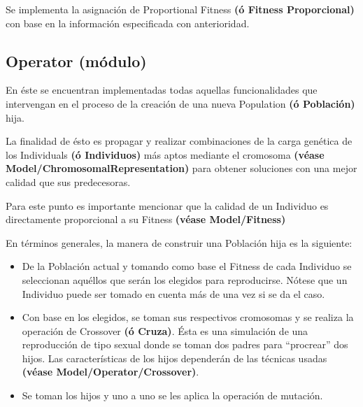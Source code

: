 \documentclass[letterpaper,10pt,english]{sphinxmanual}
\begin{document}
\begin{fulllineitems}
\label{Model/Fitness/ProportionalFitness:Model.Fitness.ProportionalFitness.assign_fitness}
Se implementa la asignación de Proportional Fitness \textbf{(ó Fitness Proporcional)}
con base en la información especificada con anterioridad.

\end{fulllineitems}



\subsection{Operator (módulo)}
\label{Model/Operator/Operator:operator-modulo}\label{Model/Operator/Operator::doc}
\begin{DUlineblock}{0em}
\item[] En éste se encuentran implementadas todas aquellas funcionalidades que intervengan
en el proceso de la creación de una nueva Population \textbf{(ó Población)} hija.
\item[] La finalidad de ésto es propagar y realizar combinaciones de la carga genética de
los Individuals \textbf{(ó Individuos)} más aptos mediante el cromosoma \textbf{(véase Model/ChromosomalRepresentation)} para obtener soluciones con una mejor calidad
que sus predecesoras.
\item[] Para este punto es importante mencionar que la calidad de un Individuo es directamente proporcional a su Fitness
\textbf{(véase Model/Fitness)}
\item[] En términos generales, la manera de construir una Población hija es la siguiente:
\end{DUlineblock}
\begin{itemize}
\item {} 
De la Población actual y tomando como base el Fitness de cada Individuo se seleccionan aquéllos que serán los elegidos para reproducirse. Nótese que un Individuo puede ser tomado en cuenta más de una vez si se da el caso.

\item {} 
Con base en los elegidos, se toman sus respectivos cromosomas y se realiza la operación de Crossover \textbf{(ó Cruza)}. Ésta es una simulación de una reproducción de tipo sexual donde se toman dos padres para ``procrear'' dos hijos. Las características de los hijos dependerán de las técnicas usadas \textbf{(véase Model/Operator/Crossover)}.

\item {} 
Se toman los hijos y uno a uno se les aplica la operación de mutación.

\end{itemize}
\end{document}
